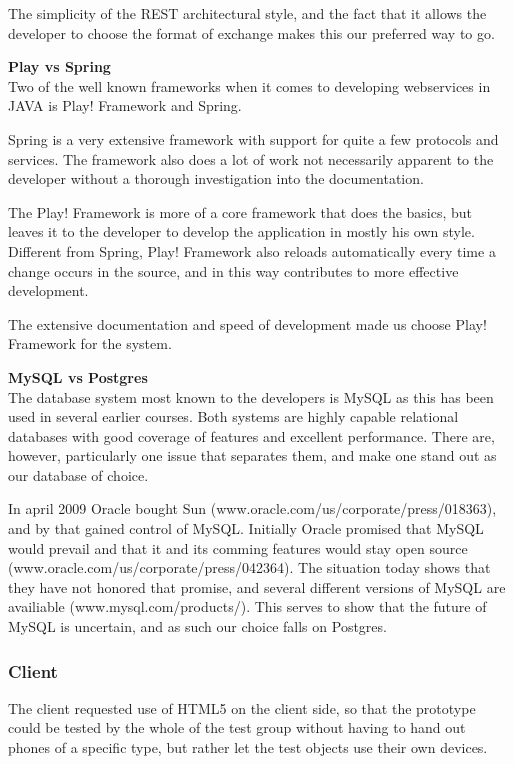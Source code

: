 \documentclass[11pt]{book}
\begin{document}
The simplicity of the REST architectural style, and the fact that it allows the developer to choose the format of exchange makes this our preferred way to go.

\textbf{Play vs Spring}\\
Two of the well known frameworks when it comes to developing webservices in JAVA is Play! Framework and Spring.

Spring is a very extensive framework with support for quite a few protocols and services. The framework also does a lot of work not necessarily apparent to the developer without a thorough investigation into the documentation.

The Play! Framework is more of a core framework that does the basics, but leaves it to the developer to develop the application in mostly his own style. Different from Spring, Play! Framework also reloads automatically every time a change occurs in the source, and in this way contributes to more effective development.

The extensive documentation and speed of development made us choose Play! Framework for the system.

\textbf{MySQL vs Postgres}\\
The database system most known to the developers is MySQL as this has been used in several earlier courses. Both systems are highly capable relational databases with good coverage of features and excellent performance. There are, however, particularly one issue that separates them, and make one stand out as our database of choice.

In april 2009 Oracle bought Sun (www.oracle.com/us/corporate/press/018363), and by that gained control of MySQL. Initially Oracle promised that MySQL would prevail and that it and its comming features would stay open source (www.oracle.com/us/corporate/press/042364). The situation today shows that they have not honored that promise, and several different versions of MySQL are availiable (www.mysql.com/products/). This serves to show that the future of MySQL is uncertain, and as such our choice falls on Postgres.

\subsubsection{Client}
The client requested use of HTML5 on the client side, so that the prototype could be tested by the whole of the test group without having to hand out phones of a specific type, but rather let the test objects use their own devices.
\end{document}
